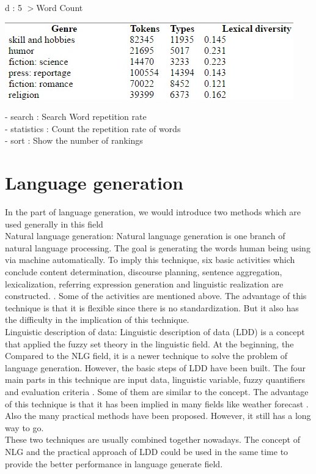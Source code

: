 d : 5 $>$Word Count

\begin{center}
	\includegraphics[width=\columnwidth]{union_02.jpg}
\end{center}
- search       \hspace{0.3cm} : Search Word repetition rate \\
- statistics   : Count the repetition rate of words \\
- sort         \hspace{0.8cm}: Show the number of rankings \\




\section*{Language generation}
In the part of language generation, we would introduce two methods which are used generally in this field  \\
Natural language generation: Natural language generation is one branch of natural language processing. The goal is generating the words human being using via machine automatically. To imply this technique, six basic activities which conclude content determination, discourse planning, sentence aggregation, lexicalization, referring expression generation and linguistic realization are constructed. \cite{aramossoto2016onthe}. Some of the activities are mentioned above. The advantage of this technique is that it is flexible since there is no standardization. But it also has the difficulty in the implication of this technique.\\
Linguistic description of data: Linguistic description of data (LDD) is a concept that applied the fuzzy set theory in the linguistic field. At the beginning, the Compared to the NLG field, it is a newer technique to solve the problem of language generation. However, the basic steps of LDD have been built. The four main parts in this technique are input data, linguistic variable, fuzzy quantifiers and evaluation criteria \cite{aramossoto2016onthe}. Some of them are similar to the concept. The advantage of this technique is that it has been implied in many fields like weather forecast \cite{Ramos-SotoBBT14}. Also the many practical methods have been proposed. However, it still has a long way to go.\\
These two techniques are usually combined together nowadays. The concept of NLG and the practical approach of LDD could be used in the same time to provide the better performance in language generate field.



